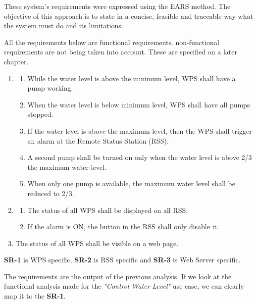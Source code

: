 \documentclass[11pt]{article}
\begin{document}
These system's requirements were expressed using the EARS method. The objective of this approach is to state in a concise, feasible and traceable way what the system must do and its limitations.

All the requirements below are functional requirements. non-functional requirements are not being taken into account. These are specified on a later chapter.

\begin{enumerate}[leftmargin=4em, font=\small, label=\textbf{SR-\arabic*}]
	\setlength\itemsep{.5em}
	\item 
		\begin{enumerate}[leftmargin=1.5em, font=\small, label=\textbf{.\arabic*:}]
		\setlength\itemsep{0em}
		\item While the water level is above the minimum level, WPS shall have a pump working.
		\item When the water level is below minimum level, WPS shall have all pumps stopped.
		\item If the water level is above the maximum level, then the WPS shall trigger an alarm at the Remote Status Station (RSS).
		\item A second pump shall be turned on only when the water level is above 2/3 the maximum water level.
		\item When only one pump is available, the maximum water level shall be reduced to 2/3.
		\end{enumerate}
	\item
		\begin{enumerate}[leftmargin=1.5em, font=\small, label=\textbf{.\arabic*:}]
		\setlength\itemsep{0em}
		\item The status of all WPS shall be displayed on all RSS.
		\item If the alarm is ON, the button in the RSS shall only disable it.
		\end{enumerate}
	\item The status of all WPS shall be visible on a web page.

\end{enumerate}

\noindent
\textbf{SR-1} is WPS specific, \textbf{SR-2} is RSS specific and \textbf{SR-3} is Web Server specific.

The requirements are the output of the previous analysis. If we look at the functional analysis made for the \textit{"Control Water Level"} use case, we can clearly map it to the \textbf{SR-1}. 
\end{document}
